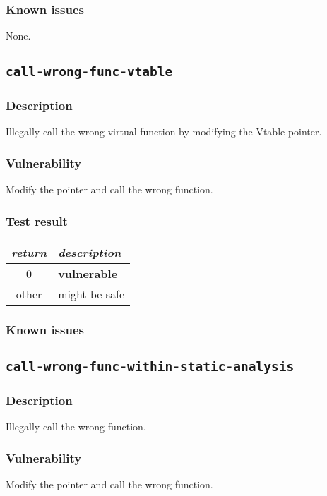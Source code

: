 \documentclass[a4paper]{book}
\begin{document}
\subsubsection{Known issues}
None.

\newpage

\subsection{\texttt{call-wrong-func-vtable}}\label{test-call-wrong-func-vtable}

\subsubsection{Description}
Illegally call the wrong virtual function by modifying the Vtable pointer.
\subsubsection{Vulnerability}
Modify the pointer and call the wrong function.

\subsubsection{Test result}
\begin{tabular}{cl}
  \toprule
  \emph{return}  & \emph{description} \\
  \midrule
  0              & \textbf{vulnerable} \\
  other          & might be safe \\
  \bottomrule
\end{tabular}
  
\subsubsection{Known issues}

\newpage

\subsection{\texttt{call-wrong-func-within-static-analysis}}\label{test-call-wrong-func-within-static-analysis}

\subsubsection{Description}
Illegally call the wrong function.
\subsubsection{Vulnerability}
Modify the pointer and call the wrong function.
\end{document}
